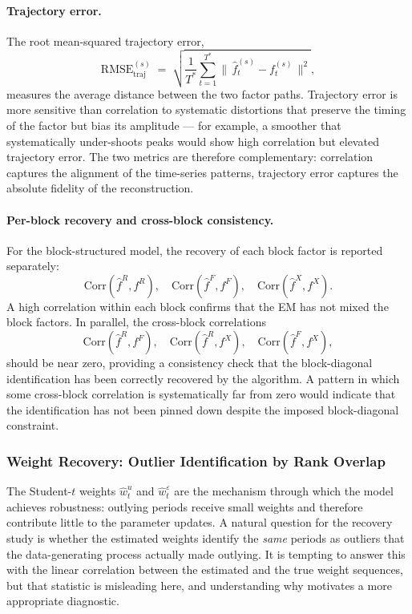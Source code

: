 \documentclass[11pt, a4paper, oneside]{article}
\begin{document}
\paragraph{Trajectory error.}
The root mean-squared trajectory error,
\[
\mathrm{RMSE}_{\mathrm{traj}}^{(s)} \;=\; \sqrt{\frac{1}{T^*}\sum_{t=1}^{T^*} \big\|\,\hat{f}_t^{(s)} - f_t^{(s)}\,\big\|^2},
\]
measures the average distance between the two factor paths.
Trajectory error is more sensitive than correlation to systematic
distortions that preserve the timing of the factor but bias its
amplitude — for example, a smoother that systematically
under-shoots peaks would show high correlation but elevated
trajectory error. The two metrics are therefore complementary:
correlation captures the alignment of the time-series patterns,
trajectory error captures the absolute fidelity of the
reconstruction.

\paragraph{Per-block recovery and cross-block consistency.}
For the block-structured model, the recovery of each block factor
is reported separately:
\[
\mathrm{Corr}(\hat{f}^R, f^R),\quad
\mathrm{Corr}(\hat{f}^F, f^F),\quad
\mathrm{Corr}(\hat{f}^X, f^X).
\]
A high correlation within each block confirms that the EM has not
mixed the block factors. In parallel, the cross-block correlations
\[
\mathrm{Corr}(\hat{f}^R, f^F),\quad
\mathrm{Corr}(\hat{f}^R, f^X),\quad
\mathrm{Corr}(\hat{f}^F, f^X),
\]
should be near zero, providing a consistency check that the
block-diagonal identification has been correctly recovered by the
algorithm. A pattern in which some cross-block correlation is
systematically far from zero would indicate that the
identification has not been pinned down despite the imposed
block-diagonal constraint.


\subsubsection*{Weight Recovery: Outlier Identification by Rank Overlap}

The Student-$t$ weights $\hat{w}^u_t$ and $\hat{w}^\varepsilon_t$ are
the mechanism through which the model achieves robustness: outlying
periods receive small weights and therefore contribute little to the
parameter updates. A natural question for the recovery study is
whether the estimated weights identify the \emph{same} periods as
outliers that the data-generating process actually made outlying. It
is tempting to answer this with the linear correlation between the
estimated and the true weight sequences, but that statistic is
misleading here, and understanding why motivates a more appropriate
diagnostic.
\end{document}
